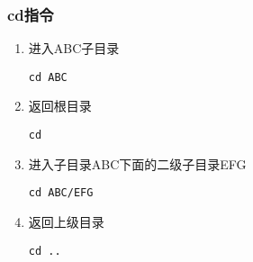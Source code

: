 \subsubsection{cd指令}
\begin{enumerate}

    \item 进入ABC子目录
          \begin{lstlisting}
cd ABC
\end{lstlisting}

    \item 返回根目录
          \begin{lstlisting}
cd 
\end{lstlisting}

    \item 进入子目录ABC下面的二级子目录EFG
          \begin{lstlisting}
cd ABC/EFG
\end{lstlisting}

    \item 返回上级目录
          \begin{lstlisting}
cd ..
\end{lstlisting}
\end{enumerate}


